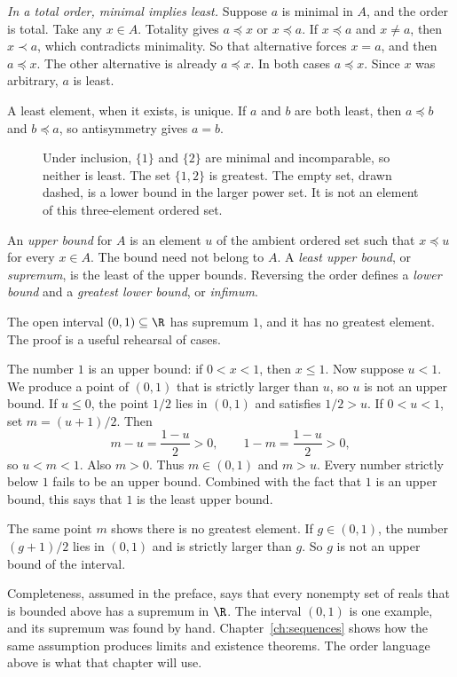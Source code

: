 \emph{In a total order, minimal implies least.} Suppose $a$ is minimal in $A$, and the order is total. Take any $x\in A$. Totality gives $a\preceq x$ or $x\preceq a$. If $x\preceq a$ and $x\ne a$, then $x\prec a$, which contradicts minimality. So that alternative forces $x=a$, and then $a\preceq x$. The other alternative is already $a\preceq x$. In both cases $a\preceq x$. Since $x$ was arbitrary, $a$ is least.

A least element, when it exists, is unique. If $a$ and $b$ are both least, then $a\preceq b$ and $b\preceq a$, so antisymmetry gives $a=b$.

\begin{figure}[ht]
\centering
{}
\caption{Under inclusion, $\{1\}$ and $\{2\}$ are minimal and incomparable, so neither is least. The set $\{1,2\}$ is greatest. The empty set, drawn dashed, is a lower bound in the larger power set. It is not an element of this three-element ordered set.}
\label{fig:lang-order}
\end{figure}

An \emph{upper bound} for $A$ is an element $u$ of the ambient ordered set such that $x\preceq u$ for every $x\in A$. The bound need not belong to $A$. A \emph{least upper bound}, or \emph{supremum}, is the least of the upper bounds. Reversing the order defines a \emph{lower bound} and a \emph{greatest lower bound}, or \emph{infimum}.

The open interval $(0,1)\subseteq\R$ has supremum $1$, and it has no greatest element. The proof is a useful rehearsal of cases.

The number $1$ is an upper bound: if $0<x<1$, then $x\le 1$. Now suppose $u<1$. We produce a point of $(0,1)$ that is strictly larger than $u$, so $u$ is not an upper bound. If $u\le 0$, the point $1/2$ lies in $(0,1)$ and satisfies $1/2>u$. If $0<u<1$, set $m=(u+1)/2$. Then
\[
m-u=\frac{1-u}{2}>0,\qquad 1-m=\frac{1-u}{2}>0,
\]
so $u<m<1$. Also $m>0$. Thus $m\in(0,1)$ and $m>u$. Every number strictly below $1$ fails to be an upper bound. Combined with the fact that $1$ is an upper bound, this says that $1$ is the least upper bound.

The same point $m$ shows there is no greatest element. If $g\in(0,1)$, the number $(g+1)/2$ lies in $(0,1)$ and is strictly larger than $g$. So $g$ is not an upper bound of the interval.

Completeness, assumed in the preface, says that every nonempty set of reals that is bounded above has a supremum in $\R$. The interval $(0,1)$ is one example, and its supremum was found by hand. Chapter~\ref{ch:sequences} shows how the same assumption produces limits and existence theorems. The order language above is what that chapter will use.

